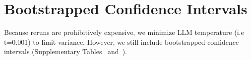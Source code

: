 
\section*{Bootstrapped Confidence Intervals}\label{appdx: CIs}
Because reruns are prohibitively expensive, we minimize LLM temperature (i.e t=0.001) to limit variance. However, we still include bootstrapped confidence intervals (Supplementary Tables~\sTabPhenoCI{} and~\sTabRareCI).


